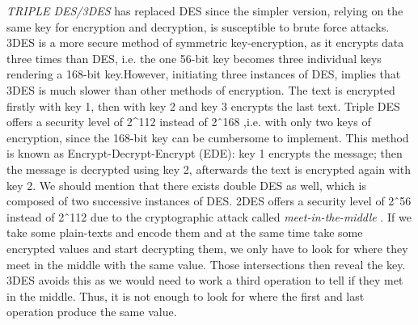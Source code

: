 \textit{TRIPLE DES/3DES} has replaced DES since the simpler version, relying on the same key for encryption and decryption, is susceptible to brute force attacks. 3DES is a more secure method of symmetric key-encryption, as it encrypts data three times than DES, i.e. the one 56-bit key becomes three individual keys rendering a 168-bit key.However, initiating three instances of DES, implies that 3DES is much slower than other methods of encryption. The text is encrypted firstly with key 1, then with key 2 and key 3 encrypts the last text. Triple DES offers a security level of 2^112 instead of 2ˆ{168} ,i.e. with only two keys of encryption, since the 168-bit key can be cumbersome to implement. This method is known as Encrypt-Decrypt-Encrypt (EDE): key 1 encrypts the message; then the message is decrypted using key 2, afterwards the text is encrypted again with key 2. We should mention that there exists double DES as well, which is composed of two successive instances of DES. 2DES offers a security level of 2ˆ{56} instead of 2ˆ{112} due to the cryptographic attack called \emph{meet-in-the-middle} \cite{mitm}. If we take some plain-texts and encode them and at the same time take some encrypted values and start decrypting them, we only have to look for where they meet in the middle with the same value. Those intersections then reveal the key. 3DES avoids this as we would need to work a third operation to tell if they met in the middle. Thus, it is not enough to look for where the first and last operation produce the same value.

